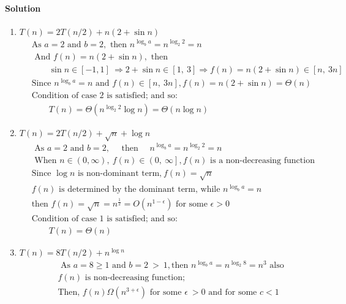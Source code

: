 \documentclass[a4paper]{scrartcl}
\begin{document}
\paragraph{Solution}
\begin{enumerate}[label=(\alph*)]
  \item $T (n) = 2T (n/2) + n(2 + \sin{n})$
\begin{align*}
  &\ \text{As }a = 2\text{ and }b = 2,\text{ then }n^{\log_b{a}} = n^{\log_2{2}} = n\\
  &\ \text{ And }f(n) = n(2 + \sin{n}),\text{ then}\\ &\
  \qquad \sin{n} \in \left[-1, 1\right]\ \Rightarrow 2+\sin{n} \in \left[1,\ 3\right] \Rightarrow f(n) = n\left(2 + \sin{n}\right) \in \left[n,\ 3n\right]\\ &\
  \text{Since }n^{\log_b{a}} = n\text{ and }f(n) \in \left[n,\ 3n\right], f(n) = n(2 + \sin{n}) = \Theta(n)\\ &\
  \text{Condition of case 2 is satisfied; and so:}\\
  &\ \qquad T(n)=\Theta\left({n^{\log_2{2}}\log{n}}\right) =\Theta\left({n\log{n}}\right)
\end{align*}
\item $T (n) = 2T (n/2) + \sqrt{n} + \log{n}$
\begin{align*}
  &\ \text{ As }a = 2\text{ and }b = 2,\quad\text{ then }\quad n^{\log_b{a}} = n^{\log_2{2}} = n\\
  &\ \text{ When }n \in \left(0, \infty\right),\ f(n) \in \left(0,\ \infty\right], f(n)\text{ is a non-decreasing function}\\
  &\ \text{Since }\log{n}\text{ is non-dominant term,}\ f(n)=\sqrt{n} \\ &\ 
  f(n)\text{ is determined by the dominant term, while }n^{\log_b{a}}=n\\ &\
  \text{then }f(n) = \sqrt{n}=n^{\frac{1}{2}}=O(n^{1-\epsilon})\text{ for some } \epsilon > 0\\ &\
  \text{Condition of case 1 is satisfied; and so:}\\
  &\ \qquad T(n)=\Theta(n)
\end{align*}
\item $T (n) = 8T (n/2) + n^{\log{n}}$
\begin{align*}
  &\ \text{ As }a = 8\geq 1\text{ and }b = 2\ >\ 1,\text{then }n^{\log_b{a}} = n^{\log_2{8}} = n^3\text{ also}\\ &\
   f(n)\text{ is non-decreasing function;}\\ &\
   \text{Then, }f(n)\Omega(n^{3+\epsilon})\text{ for some }\epsilon\ >0\text{ and for some }c < 1\\ &\

\end{align*}
\end{enumerate}
\end{document}

